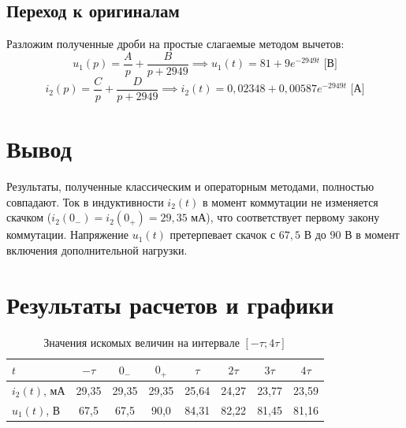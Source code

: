 \documentclass[a4paper,12pt]{article}
\begin{document}
\subsection{Переход к оригиналам}
Разложим полученные дроби на простые слагаемые методом вычетов:
\begin{equation}
    u_1(p) = \frac{A}{p} + \frac{B}{p + 2949} \implies u_1(t) = 81 + 9e^{-2949t} \text{ [В]}
\end{equation}
\begin{equation}
    i_2(p) = \frac{C}{p} + \frac{D}{p + 2949} \implies i_2(t) = 0{,}02348 + 0{,}00587e^{-2949t} \text{ [А]}
\end{equation}

\section{Вывод}
Результаты, полученные классическим и операторным методами, полностью совпадают. Ток в индуктивности $i_2(t)$ в момент коммутации не изменяется скачком ($i_2(0_-) = i_2(0_+) = 29{,}35$ мА), что соответствует первому закону коммутации. Напряжение $u_1(t)$ претерпевает скачок с $67{,}5$ В до $90$ В в момент включения дополнительной нагрузки.


\section{Результаты расчетов и графики}

\begin{table}[h!]
    \centering
    \caption{Значения искомых величин на интервале $[-\tau; 4\tau]$}
    \begin{tabularx}{\textwidth}{l|cc|ccccc}
        \toprule
        $t$ & $-\tau$ & $0_-$ & $0_+$ & $\tau$ & $2\tau$ & $3\tau$ & $4\tau$ \\
        \midrule
        $i_2(t)$, мА & 29,35 & 29,35 & 29,35 & 25,64 & 24,27 & 23,77 & 23,59 \\
        $u_1(t)$, В & 67,5 & 67,5 & 90,0 & 84,31 & 82,22 & 81,45 & 81,16 \\
        \bottomrule
    \end{tabularx}
\end{table}

\begin{center}
\end{center}
\end{document}
